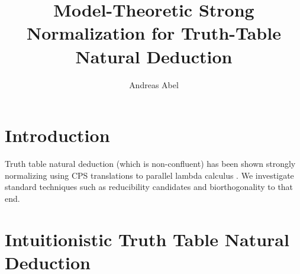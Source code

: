 \documentclass[a4paper,USenglish,cleveref, autoref, thm-restate]{lipics-v2019}
\title{Model-Theoretic Strong Normalization for Truth-Table Natural Deduction}
\author{Andreas Abel
  }{Department of Computer Science,
    Gothenburg University,
    Sweden
  }{andreas.abel@gu.se
  }{https://orcid.org/0000-0003-0420-4492
  }{(Optional) author-specific funding acknowledgements}
\begin{document}
\maketitle

\begin{abstract}
\end{abstract}

\section{Introduction}
\label{sec:intro}

%
%
%
%


%
%
%
%
%

Truth table natural deduction
\cite{geuversHurkens:icla17,geuversHurkens:types17}
(which is non-confluent) has been shown
strongly normalizing using CPS translations to parallel lambda
calculus \cite{geuversGiessenHurkens:fundinf19}.  We investigate
standard techniques such as reducibility candidates and
biorthogonality to that end.

\section{Intuitionistic Truth Table Natural Deduction}
\label{sec:nd}
\end{document}
